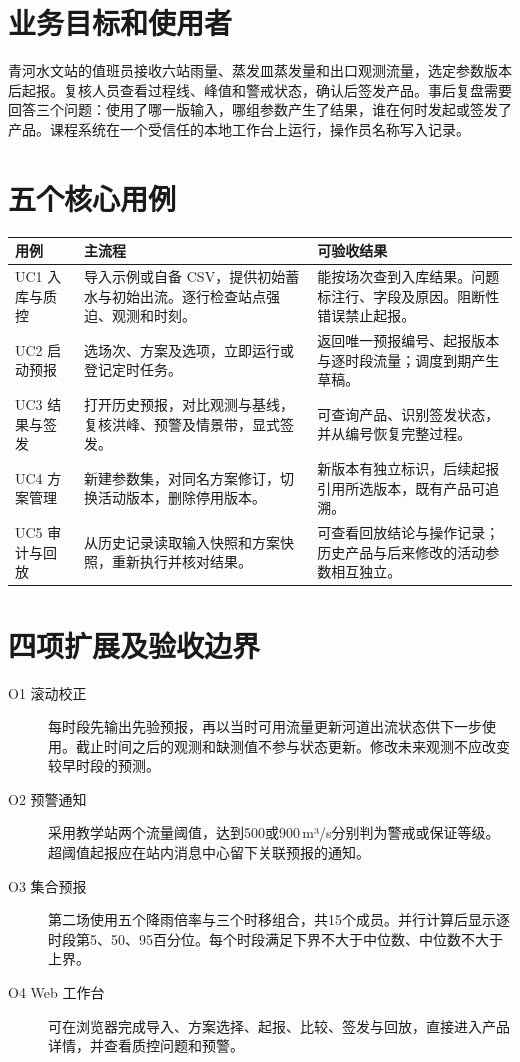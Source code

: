 

\section{业务目标和使用者}
青河水文站的值班员接收六站雨量、蒸发皿蒸发量和出口观测流量，选定参数版本后起报。复核人员查看过程线、峰值和警戒状态，确认后签发产品。事后复盘需要回答三个问题：使用了哪一版输入，哪组参数产生了结果，谁在何时发起或签发了产品。课程系统在一个受信任的本地工作台上运行，操作员名称写入记录。
\section{五个核心用例}
\noindent\begin{tabularx}{\linewidth}{@{}p{2.5cm}LL@{}}\toprule 用例 & 主流程 & 可验收结果\\\midrule
UC1 入库与质控 & 导入示例或自备 CSV，提供初始蓄水与初始出流。逐行检查站点强迫、观测和时刻。 & 能按场次查到入库结果。问题标注行、字段及原因。阻断性错误禁止起报。\\
UC2 启动预报 & 选场次、方案及选项，立即运行或登记定时任务。 & 返回唯一预报编号、起报版本与逐时段流量；调度到期产生草稿。\\
UC3 结果与签发 & 打开历史预报，对比观测与基线，复核洪峰、预警及情景带，显式签发。 & 可查询产品、识别签发状态，并从编号恢复完整过程。\\
UC4 方案管理 & 新建参数集，对同名方案修订，切换活动版本，删除停用版本。 & 新版本有独立标识，后续起报引用所选版本，既有产品可追溯。\\
UC5 审计与回放 & 从历史记录读取输入快照和方案快照，重新执行并核对结果。 & 可查看回放结论与操作记录；历史产品与后来修改的活动参数相互独立。\\\bottomrule
\end{tabularx}
\section{四项扩展及验收边界}
\begin{description}
\item[O1 滚动校正] 每时段先输出先验预报，再以当时可用流量更新河道出流状态供下一步使用。截止时间之后的观测和缺测值不参与状态更新。修改未来观测不应改变较早时段的预测。
\item[O2 预警通知] 采用教学站两个流量阈值，达到500或900\,m³/s分别判为警戒或保证等级。超阈值起报应在站内消息中心留下关联预报的通知。
\item[O3 集合预报] 第二场使用五个降雨倍率与三个时移组合，共15个成员。并行计算后显示逐时段第5、50、95百分位。每个时段满足下界不大于中位数、中位数不大于上界。
\item[O4 Web 工作台] 可在浏览器完成导入、方案选择、起报、比较、签发与回放，直接进入产品详情，并查看质控问题和预警。
\end{description}
